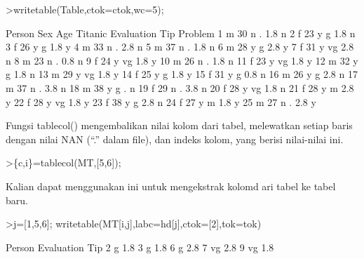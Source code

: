 \documentclass{article}
\begin{document}
\begin{eulernotebook}
\begin{eulerprompt}
>writetable(Table,ctok=ctok,wc=5);
\end{eulerprompt}
\begin{euleroutput}
   Person  Sex  Age Titanic Evaluation  Tip Problem
        1    m   30       n          .  1.8       n
        2    f   23       y          g  1.8       n
        3    f   26       y          g  1.8       y
        4    m   33       n          .  2.8       n
        5    m   37       n          .  1.8       n
        6    m   28       y          g  2.8       y
        7    f   31       y         vg  2.8       n
        8    m   23       n          .  0.8       n
        9    f   24       y         vg  1.8       y
       10    m   26       n          .  1.8       n
       11    f   23       y         vg  1.8       y
       12    m   32       y          g  1.8       n
       13    m   29       y         vg  1.8       y
       14    f   25       y          g  1.8       y
       15    f   31       y          g  0.8       n
       16    m   26       y          g  2.8       n
       17    m   37       n          .  3.8       n
       18    m   38       y          g    .       n
       19    f   29       n          .  3.8       n
       20    f   28       y         vg  1.8       n
       21    f   28       y          m  2.8       y
       22    f   28       y         vg  1.8       y
       23    f   38       y          g  2.8       n
       24    f   27       y          m  1.8       y
       25    m   27       n          .  2.8       y
\end{euleroutput}
\begin{eulercomment}
Fungsi tablecol() mengembalikan nilai kolom dari tabel, melewatkan
setiap baris dengan nilai NAN (“.” dalam file), dan indeks kolom, yang
berisi nilai-nilai ini.
\end{eulercomment}
\begin{eulerprompt}
>\{c,i\}=tablecol(MT,[5,6]);
\end{eulerprompt}
\begin{eulercomment}
Kalian dapat menggunakan ini untuk mengekstrak kolomd ari tabel ke
tabel baru.
\end{eulercomment}
\begin{eulerprompt}
>j=[1,5,6]; writetable(MT[i,j],labc=hd[j],ctok=[2],tok=tok)
\end{eulerprompt}
\begin{euleroutput}
      Person Evaluation       Tip
           2          g       1.8
           3          g       1.8
           6          g       2.8
           7         vg       2.8
           9         vg       1.8

\end{euleroutput}
\end{eulernotebook}
\end{document}
